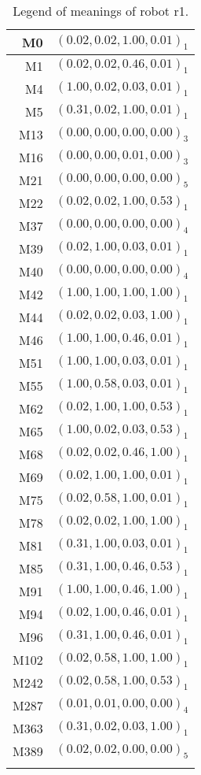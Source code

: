 \begin{table}[h]
\centering
{\footnotesize\begin{tabular}{rc}
\lsptoprule
M0 & $(0.02,0.02,1.00,0.01)_1$\\\hline
M1 & $(0.02,0.02,0.46,0.01)_1$\\\hline
M4 & $(1.00,0.02,0.03,0.01)_1$\\\hline
M5 & $(0.31,0.02,1.00,0.01)_1$\\\hline
M13 & $(0.00,0.00,0.00,0.00)_3$\\\hline
M16 & $(0.00,0.00,0.01,0.00)_3$\\\hline
M21 & $(0.00,0.00,0.00,0.00)_5$\\\hline
M22 & $(0.02,0.02,1.00,0.53)_1$\\\hline
M37 & $(0.00,0.00,0.00,0.00)_4$\\\hline
M39 & $(0.02,1.00,0.03,0.01)_1$\\\hline
M40 & $(0.00,0.00,0.00,0.00)_4$\\\hline
M42 & $(1.00,1.00,1.00,1.00)_1$\\\hline
M44 & $(0.02,0.02,0.03,1.00)_1$\\\hline
M46 & $(1.00,1.00,0.46,0.01)_1$\\\hline
M51 & $(1.00,1.00,0.03,0.01)_1$\\\hline
M55 & $(1.00,0.58,0.03,0.01)_1$\\\hline
M62 & $(0.02,1.00,1.00,0.53)_1$\\\hline
M65 & $(1.00,0.02,0.03,0.53)_1$\\\hline
M68 & $(0.02,0.02,0.46,1.00)_1$\\\hline
M69 & $(0.02,1.00,1.00,0.01)_1$\\\hline
M75 & $(0.02,0.58,1.00,0.01)_1$\\\hline
M78 & $(0.02,0.02,1.00,1.00)_1$\\\hline
M81 & $(0.31,1.00,0.03,0.01)_1$\\\hline
M85 & $(0.31,1.00,0.46,0.53)_1$\\\hline
M91 & $(1.00,1.00,0.46,1.00)_1$\\\hline
M94 & $(0.02,1.00,0.46,0.01)_1$\\\hline
M96 & $(0.31,1.00,0.46,0.01)_1$\\\hline
M102 & $(0.02,0.58,1.00,1.00)_1$\\\hline
M242 & $(0.02,0.58,1.00,0.53)_1$\\\hline
M287 & $(0.01,0.01,0.00,0.00)_4$\\\hline
M363 & $(0.31,0.02,0.03,1.00)_1$\\\hline
M389 & $(0.02,0.02,0.00,0.00)_5$\\
\lspbottomrule
\end{tabular}}
\caption{Legend of meanings of robot r1.}
\label{t:st:legend1a}
\end{table}